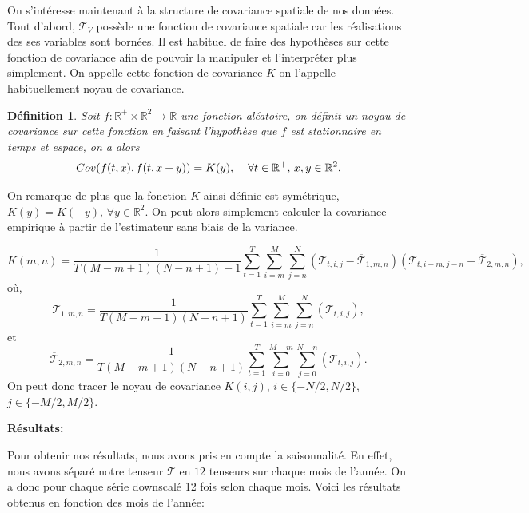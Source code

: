 \documentclass[a4paper,11pt]{article}
\numberwithin{equation}{section}
\newtheorem{definition}{Définition}
\begin{document}
\vspace{0.7cm}

On s'intéresse maintenant à la structure de covariance spatiale de nos données. Tout d'abord, $\mathcal{T}_{V}$ possède une fonction de covariance spatiale car les réalisations des ses variables sont bornées. Il est habituel de faire des hypothèses sur cette fonction de covariance afin de pouvoir la manipuler et l'interpréter plus simplement. On appelle cette fonction de covariance $K$ on l'appelle habituellement noyau de covariance.

\begin{definition}
	Soit $f:\mathbb{R}^{+}\times\mathbb{R}^2\to \mathbb{R}$ une fonction aléatoire, on définit un noyau de covariance sur cette fonction en faisant l'hypothèse que $f$ est stationnaire en temps et espace, on a alors
	\[Cov(f(t,x),f(t,x+y))=K(y), \hspace{4mm} \forall t \in \mathbb{R}^{+},\,x,y \in \mathbb{R}^2. \] 
\end{definition}

On remarque de plus que la fonction $K$ ainsi définie est symétrique, $K(y)=K(-y),\, \forall y \in \mathbb{R}^2$. On peut alors simplement calculer la covariance empirique à partir de l'estimateur sans biais de la variance.

\[K(m,n)=\frac{1}{T(M-m+1)(N-n+1)-1}\sum_{t=1}^{T}\sum_{i=m}^{M}\sum_{j=n}^{N}(\mathcal{T}_{t,i,j}-\overline{\mathcal{T}}_{1,m,n})(\mathcal{T}_{t,i-m,j-n}-\overline{\mathcal{T}}_{2,m,n}),\]
où,
\[\overline{\mathcal{T}}_{1,m,n}=\frac{1}{T(M-m+1)(N-n+1)}\sum_{t=1}^{T}\sum_{i=m}^{M}\sum_{j=n}^{N}(\mathcal{T}_{t,i,j}),\]
et 
\[\overline{\mathcal{T}}_{2,m,n}=\frac{1}{T(M-m+1)(N-n+1)}\sum_{t=1}^{T}\sum_{i=0}^{M-m}\sum_{j=0}^{N-n}(\mathcal{T}_{t,i,j}).\]
On peut donc tracer le noyau de covariance $K(i,j)$, $i \in\{-N/2,N/2\}$, $j \in \{-M/2,M/2\}$. 

\vspace{0.7cm}

\noindent \textbf{Résultats:}

Pour obtenir nos résultats, nous avons pris en compte la saisonnalité. En effet, nous avons séparé notre tenseur $\mathcal{T}$ en $12$ tenseurs sur chaque mois de l'année. On a donc pour chaque série downscalé 12 fois selon chaque mois. Voici les résultats obtenus en fonction des mois de l'année:
\end{document}
